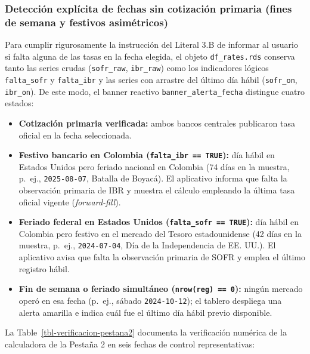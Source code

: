 \documentclass[
  10pt,
  letterpaper,
  DIV=11,
  numbers=noendperiod]{scrartcl}
\providecommand{\tightlist}{%
  \setlength{\itemsep}{0pt}\setlength{\parskip}{0pt}}
\begin{document}
\subsubsection{Detección explícita de fechas sin cotización primaria
(fines de semana y festivos
asimétricos)}\label{detecciuxf3n-expluxedcita-de-fechas-sin-cotizaciuxf3n-primaria-fines-de-semana-y-festivos-asimuxe9tricos}

Para cumplir rigurosamente la instrucción del Literal 3.B de informar al
usuario si falta alguna de las tasas en la fecha elegida, el objeto
\texttt{df\_rates.rds} conserva tanto las series crudas
(\texttt{sofr\_raw}, \texttt{ibr\_raw}) como los indicadores lógicos
\texttt{falta\_sofr} y \texttt{falta\_ibr} y las series con arrastre del
último día hábil (\texttt{sofr\_on}, \texttt{ibr\_on}). De este modo, el
banner reactivo \texttt{banner\_alerta\_fecha} distingue cuatro estados:

\begin{itemize}
\tightlist
\item
  \textbf{Cotización primaria verificada:} ambos bancos centrales
  publicaron tasa oficial en la fecha seleccionada.
\item
  \textbf{Festivo bancario en Colombia (\texttt{falta\_ibr\ ==\ TRUE}):}
  día hábil en Estados Unidos pero feriado nacional en Colombia (74 días
  en la muestra, p.~ej., \texttt{2025-08-07}, Batalla de Boyacá). El
  aplicativo informa que falta la observación primaria de IBR y muestra
  el cálculo empleando la última tasa oficial vigente
  (\emph{forward-fill}).
\item
  \textbf{Feriado federal en Estados Unidos
  (\texttt{falta\_sofr\ ==\ TRUE}):} día hábil en Colombia pero festivo
  en el mercado del Tesoro estadounidense (42 días en la muestra,
  p.~ej., \texttt{2024-07-04}, Día de la Independencia de EE. UU.). El
  aplicativo avisa que falta la observación primaria de SOFR y emplea el
  último registro hábil.
\item
  \textbf{Fin de semana o feriado simultáneo
  (\texttt{nrow(reg)\ ==\ 0}):} ningún mercado operó en esa fecha
  (p.~ej., sábado \texttt{2024-10-12}); el tablero despliega una alerta
  amarilla e indica cuál fue el último día hábil previo disponible.
\end{itemize}

La Table~\ref{tbl-verificacion-pestana2} documenta la verificación
numérica de la calculadora de la Pestaña 2 en seis fechas de control
representativas:
\end{document}
